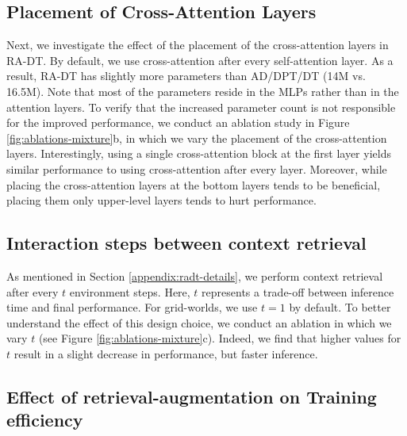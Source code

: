 \subsection{Placement of Cross-Attention Layers}\label{appendix:ca-layer-placement}
Next, we investigate the effect of the placement of the cross-attention layers in RA-DT. 
By default, we use cross-attention after every self-attention layer.
As a result, RA-DT has slightly more parameters than AD/DPT/DT (14M vs. 16.5M).
Note that most of the parameters reside in the MLPs rather than in the attention layers.
To verify that the increased parameter count is not responsible for the improved performance, we conduct an ablation study in Figure \ref{fig:ablations-mixture}b, in which we vary the placement of the cross-attention layers. 
Interestingly, using a single cross-attention block at the first layer yields similar performance to using cross-attention after every layer.
Moreover, while placing the cross-attention layers at the bottom layers tends to be beneficial, placing them only upper-level layers tends to hurt performance. 

\subsection{Interaction steps between context retrieval}\label{appendix:steps-between-retrievals}
As mentioned in Section \ref{appendix:radt-details}, we perform context retrieval after every $t$ environment steps.
Here, $t$ represents a trade-off between inference time and final performance. 
For grid-worlds, we use $t=1$ by default.
To better understand the effect of this design choice, we conduct an ablation in which we vary $t$ (see Figure \ref{fig:ablations-mixture}c). 
Indeed, we find that higher values for $t$ result in a slight decrease in performance, but faster inference. 

\subsection{Effect of retrieval-augmentation on Training efficiency} \label{appendix:training-efficiency}

